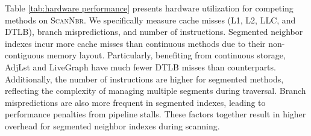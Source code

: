 Table \ref{tab:hardware performance} presents hardware utilization for competing methods on \textsc{ScanNbr}. We specifically measure cache misses (L1, L2, LLC, and DTLB), branch mispredictions, and number of instructions. Segmented neighbor indexes incur more cache misses than continuous methods due to their non-contiguous memory layout. Particularly, benefiting from continuous storage, AdjLst and LiveGraph have much fewer DTLB misses than counterparts. Additionally, the number of instructions are higher for segmented methods, reflecting the complexity of managing multiple segments during traversal. Branch mispredictions are also more frequent in segmented indexes, leading to performance penalties from pipeline stalls. These factors together result in higher overhead for segmented neighbor indexes during scanning.

